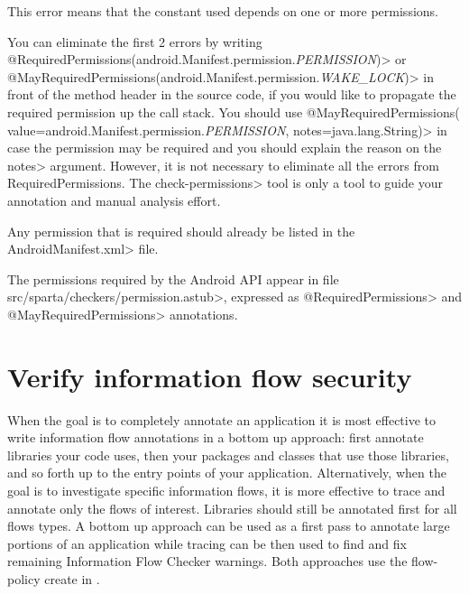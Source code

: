 This error means that the constant used depends on one or more permissions.

You can eliminate the first 2 errors by writing
\<@RequiredPermissions({android.Manifest.permission.\emph{PERMISSION}})> or
\<@MayRequiredPermissions({android.Manifest.permission.\emph{WAKE\_LOCK}})> in
front of the method header in the source code, if you would like to propagate the
required permission up the call stack. 
You should use 
\<@MayRequiredPermissions( value={android.Manifest.permission.\emph{PERMISSION}},
notes=java.lang.String)> in case the permission may be required and you should 
explain the reason on the \<notes> argument.
However, it is not necessary to eliminate all the errors from RequiredPermissions.   
The \<check-permissions> tool is only a tool to guide your annotation and manual analysis effort. 

Any permission that is required should already be listed in the
\<AndroidManifest.xml> file.

The permissions required by the Android API appear in file
\<src/sparta/checkers/permission.astub>, expressed as
\<@RequiredPermissions> and \<@MayRequiredPermissions> annotations.




\section{Verify information flow security\label{verify-information-flow-security}}

When the goal is to completely annotate an application it is
most effective to write information flow annotations in a bottom up approach:
first annotate libraries your code uses, then your packages and classes
that use those libraries, and so forth up to the entry points of your application.
Alternatively, when the goal is to investigate specific information flows, it is
more effective to trace and annotate only the flows of interest.
Libraries should still be annotated first for all flows types.
A bottom up approach can be used as a first pass to annotate large portions of an
application while tracing can be then used to find and fix remaining Information Flow Checker warnings.
Both approaches use the flow-policy create in .

